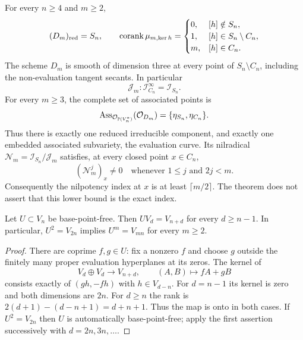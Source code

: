 \begin{theorem}
\label{thm:higher-hyperplane-global}
For every $n\ge4$ and $m\ge2$,
\begin{equation}\label{eq:hyperplane-complete-coranks}
 (D_m)_{\rm red}=S_n,\qquad
 \operatorname{corank}\mu_{m,\ker h}=
 \begin{cases}
 0,&[h]\notin S_n,\\
 1,&[h]\in S_n\setminus C_n,\\
 m,&[h]\in C_n.
 \end{cases}
\end{equation}
The scheme $D_m$ is smooth of dimension three at every point of
$S_n\setminus C_n$, including the non-evaluation tangent secants.
In particular
\begin{equation}\label{eq:hyperplane-saturation}
 \mathcal J_m:\mathcal I_{C_n}^{\infty}=\mathcal I_{S_n}.
\end{equation}
For every $m\ge3$, the complete set of associated points is
\begin{equation}\label{eq:hyperplane-associated-points}
 \operatorname{Ass}_{\mathcal O_{\mathbb P(V_n^*)}}
                  (\mathcal O_{D_m})=\{\eta_{S_n},\eta_{C_n}\}.
\end{equation}
Thus there is exactly one reduced irreducible component, and exactly
one embedded associated subvariety, the evaluation curve. Its
nilradical
$\mathcal N_m=\mathcal I_{S_n}/\mathcal J_m$ satisfies, at every
closed point $x\in C_n$,
\begin{equation}\label{eq:hyperplane-nilpotence-bound}
 (\mathcal N_m^j)_x\ne0\quad\text{whenever }1\le j\text{ and }2j<m.
\end{equation}
Consequently the nilpotency index at $x$ is at least
$\lceil m/2\rceil$. The theorem does not assert that this lower
bound is the exact index.
\end{theorem}

\begin{lemma}
\label{lem:hyperplane-propagation}
Let $U\subset V_n$ be base-point-free. Then
$UV_d=V_{n+d}$ for every $d\ge n-1$. In particular,
$U^2=V_{2n}$ implies $U^m=V_{mn}$ for every $m\ge2$.
\end{lemma}
\begin{proof}
There are coprime $f,g\in U$: fix a nonzero $f$ and choose $g$
outside the finitely many proper evaluation hyperplanes at its
zeros. The kernel of
\[
 V_d\oplus V_d\longrightarrow V_{n+d},\qquad
                  (A,B)\longmapsto fA+gB
\]
consists exactly of $(gh,-fh)$ with $h\in V_{d-n}$.
For $d=n-1$ its kernel is zero and both dimensions are $2n$.
For $d\ge n$ the rank is
$2(d+1)-(d-n+1)=d+n+1$. Thus the map is onto in both cases.
If $U^2=V_{2n}$ then $U$ is automatically base-point-free;
apply the first assertion successively with $d=2n,3n,\ldots$.
\end{proof}


